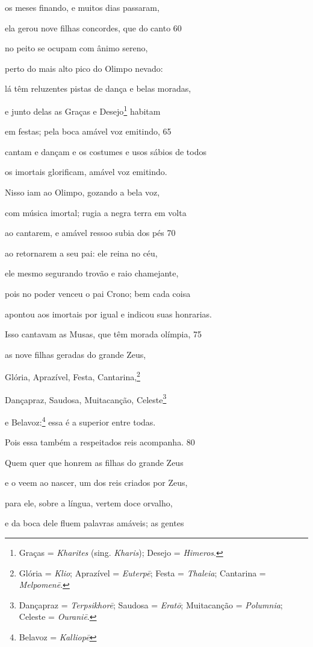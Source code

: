 os meses finando, e muitos dias passaram,

ela gerou nove filhas concordes, que do canto \num{60}

no peito se ocupam com ânimo sereno,

perto do mais alto pico do Olimpo nevado:

lá têm reluzentes pistas de dança e belas moradas,

e junto delas as Graças e Desejo\footnote{Graças = \emph{Kharites} (sing. \emph{Kharis}); Desejo = \emph{Himeros}.} habitam

em festas; pela boca amável voz emitindo, \num{65}

cantam e dançam e os costumes e usos sábios de todos

os imortais glorificam, amável voz emitindo.

Nisso iam ao Olimpo, gozando a bela voz,

com música imortal; rugia a negra terra em volta

ao cantarem, e amável ressoo subia dos pés \num{70}

ao retornarem a seu pai: ele reina no céu,

ele mesmo segurando trovão e raio chamejante,

pois no poder venceu o pai Crono; bem cada coisa

apontou aos imortais por igual e indicou suas honrarias.

\quad{}Isso cantavam as Musas, que têm morada olímpia, \num{75}

as nove filhas geradas do grande Zeus,

Glória, Aprazível, Festa, Cantarina,\footnote{Glória = \emph{Klio}; Aprazível = \emph{Euterpē}; Festa = \emph{Thaleia}; Cantarina = \emph{Melpomenē}.}

Dançapraz, Saudosa, Muitacanção, Celeste\footnote{Dançapraz = \emph{Terpsikhorē}; Saudosa = \emph{Eratō}; Muitacanção = \emph{Polumnia}; Celeste = \emph{Ouraniē}.}

e Belavoz:\footnote{Belavoz = \emph{Kalliopē}} essa é a superior entre todas.

Pois essa também a respeitados reis acompanha. \num{80}

Quem quer que honrem as filhas do grande Zeus

e o veem ao nascer, um dos reis criados por Zeus,

para ele, sobre a língua, vertem doce orvalho,

e da boca dele fluem palavras amáveis; as gentes

